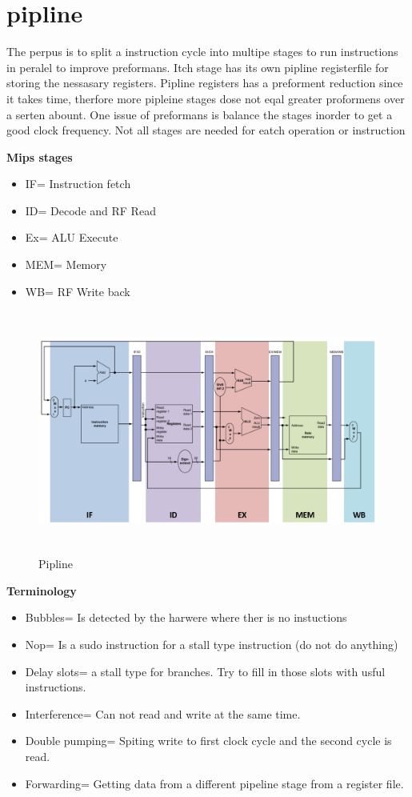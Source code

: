 \documentclass{article}
\begin{document}
\newpage


\section{pipline}
The perpus is to split a instruction cycle into multipe stages to run instructions in peralel to
improve preformans. Itch stage has its own pipline registerfile for storing the nessasary registers.
Pipline registers has a preforment reduction since it takes time, therfore more pipleine stages dose
not eqal greater proformens over a serten abount. One issue of preformans is balance the stages
inorder to get a good clock frequency. 
Not all stages are needed for eatch operation or instruction

\textbf{Mips stages}
\begin{itemize}
\item  IF= Instruction fetch
\item  ID= Decode and RF Read
\item  Ex= ALU Execute
\item  MEM= Memory
\item  WB= RF Write back
\end{itemize}

\begin{figure}[h]
    \vspace{10mm}
    \centering
    \includegraphics[width=16cm, height=8cm]{image/pipline.png} 
    \caption{Pipline}
    \label{pipline}
\end{figure}


\textbf{Terminology}
\begin{itemize}
\item  Bubbles= Is detected by the harwere where ther is no instuctions
\item  Nop= Is a sudo instruction for a stall type instruction (do not do anything)
\item  Delay slots= a stall type for branches. Try to fill in those slots with usful instructions.
\item  Interference= Can not read and write at the same time.
\item  Double pumping= Spiting write to first clock cycle and the second cycle is read.
\item  Forwarding= Getting data from a different pipeline stage from a register file.
\end{itemize}
\end{document}
